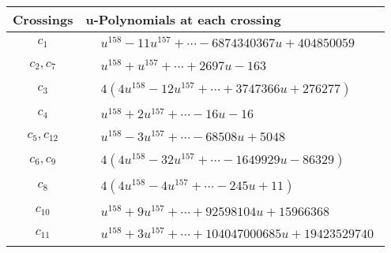 \documentclass[1p]{elsarticle_modified}
\theoremstyle{definition}
\begin{document}
\begin{tabular}{m{50pt}|m{274pt}}
Crossings & \hspace{64pt}u-Polynomials at each crossing \\
\hline $$\begin{aligned}c_{1}\end{aligned}$$&$\begin{aligned}
&u^{158}-11 u^{157}+\cdots-6874340367 u+404850059
\end{aligned}$\\
\hline $$\begin{aligned}c_{2},c_{7}\end{aligned}$$&$\begin{aligned}
&u^{158}+u^{157}+\cdots+2697 u-163
\end{aligned}$\\
\hline $$\begin{aligned}c_{3}\end{aligned}$$&$\begin{aligned}
&4(4 u^{158}-12 u^{157}+\cdots+3747366 u+276277)
\end{aligned}$\\
\hline $$\begin{aligned}c_{4}\end{aligned}$$&$\begin{aligned}
&u^{158}+2 u^{157}+\cdots-16 u-16
\end{aligned}$\\
\hline $$\begin{aligned}c_{5},c_{12}\end{aligned}$$&$\begin{aligned}
&u^{158}-3 u^{157}+\cdots-68508 u+5048
\end{aligned}$\\
\hline $$\begin{aligned}c_{6},c_{9}\end{aligned}$$&$\begin{aligned}
&4(4 u^{158}-32 u^{157}+\cdots-1649929 u-86329)
\end{aligned}$\\
\hline $$\begin{aligned}c_{8}\end{aligned}$$&$\begin{aligned}
&4(4 u^{158}-4 u^{157}+\cdots-245 u+11)
\end{aligned}$\\
\hline $$\begin{aligned}c_{10}\end{aligned}$$&$\begin{aligned}
&u^{158}+9 u^{157}+\cdots+92598104 u+15966368
\end{aligned}$\\
\hline $$\begin{aligned}c_{11}\end{aligned}$$&$\begin{aligned}
&u^{158}+3 u^{157}+\cdots+104047000685 u+19423529740
\end{aligned}$\\
\hline
\end{tabular}\\~\\
\end{document}
